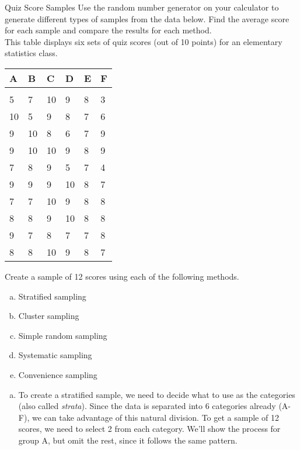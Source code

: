 \begin{example}{Quiz Score Samples}
Use the random number generator on your calculator to generate different types of samples from the data below.  Find the average score for each sample and compare the results for each method.\\

This table displays six sets of quiz scores (out of 10 points) for an elementary statistics class.
\begin{center}
\begin{tabular}{l l l l l l}
A & B & C & D & E & F\\
\hline
& & & & & \\
5 & 7 & 10 & 9 & 8 & 3\\
10 & 5 & 9 & 8 & 7 & 6\\
9 & 10 & 8 & 6 & 7 & 9\\
9 & 10 & 10 & 9 & 8 & 9\\
7 & 8 & 9 & 5 & 7 & 4\\
9 & 9 & 9 & 10 & 8 & 7\\
7 & 7 & 10 & 9 & 8 & 8\\
8 & 8 & 9 & 10 & 8 & 8\\
9 & 7 & 8 & 7 & 7 & 8\\
8 & 8 & 10 & 9 & 8 & 7\\
\end{tabular}
\end{center}

Create a sample of 12 scores using each of the following methods.
\begin{enumerate}[(a)]
\item Stratified sampling
\item Cluster sampling
\item Simple random sampling
\item Systematic sampling
\item Convenience sampling
\end{enumerate}

\sol
\begin{enumerate}[(a)]
\item To create a stratified sample, we need to decide what to use as the categories (also called \emph{strata}).  Since the data is separated into 6 categories already (A-F), we can take advantage of this natural division.  To get a sample of 12 scores, we need to select 2 from each category.  We'll show the process for group A, but omit the rest, since it follows the same pattern.\\


\end{enumerate}
\end{example}
